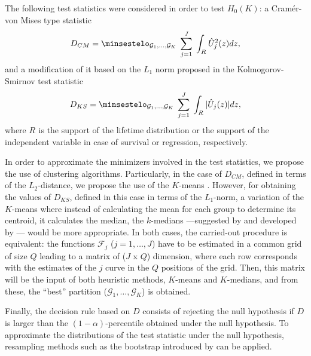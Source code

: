  
The following test statistics were considered in order to test $H_0(K)$: a Cram\'{e}r-von Mises type statistic
\begin{equation*}
D_{CM} =\displaystyle\minsestelo_{\mathcal{G}_1,\ldots,\mathcal{G}_K} \hspace{0.1cm} \sum_{j=1}^{J}  \hspace{0.1cm}  \int_{R_{}} \hat U_j^2 (z) dz,
\end{equation*}
and a modification of it based on the $L_1$ norm proposed in the Kolmogorov-Smirnov test statistic 
\begin{equation*}
D_{KS} = \displaystyle\minsestelo_{\mathcal{G}_1,\ldots,\mathcal{G}_K}  \hspace{0.1cm}  \sum_{j=1}^{J}  \hspace{0.1cm}  \int_{R_{}} | \hat U_j(z)| dz,
\end{equation*}
where $R_{}$ is the support of the lifetime distribution or the support of the independent variable in case of survival or regression, respectively.
\bigskip




In order to approximate the minimizers involved in the test statistics, we propose the use of clustering algorithms. Particularly, in the case of $D_{CM}$, defined in terms of the $L_2$-distance, we propose the use of the $K$-means  \citep{MacQueen67}.  However, for obtaining the values of $D_{KS}$, defined in this case in terms of the $L_1$-norm, a variation of the $K$-means where instead of calculating the mean for each group to determine its centroid, it  calculates the median,  the $k$-medians ---suggested by \cite{MacQueen67} and developed by \cite{books/wi/KaufmanR90}--- would  be more appropriate. In both cases, the carried-out procedure is equivalent: the  functions $\mathcal{F}_j$ ($j= 1, \ldots, J$) have to be estimated in a common grid of size $Q$ leading to a matrix of ($J$ x $Q$) dimension, where each row corresponds with the estimates of the $j$ curve in the $Q$ positions of the grid. Then, this matrix will be the input of both heuristic methods, $K$-means and $K$-medians, and from these, the ``best'' partition ($\mathcal{G}_1,\ldots,\mathcal{G}_K$)  is obtained.



Finally, the decision rule based on $D$ consists of rejecting the null hypothesis if $D$ is larger than the $(1-\alpha)$-percentile obtained under  the null hypothesis. To approximate the distributions of the test statistic under the null hypothesis, resampling methods such as the bootstrap introduced by \cite{NoRefWorks:8} can be applied. 



